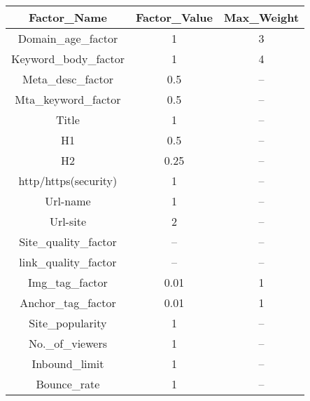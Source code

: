 \documentclass{scrreprt}
\begin{document}
    \begin{center}
\begin{tabular}{ |c|c|c| } 
 \hline 
 
Factor_Name & Factor_Value & Max_Weight \\
 \hline
 Domain_age_factor & 1 & 3 \\
 \hline
 Keyword_body_factor & 1 & 4 \\ 
  \hline
 Meta_desc_factor & 0.5 & -- \\
 \hline
 Mta_keyword_factor & 0.5 & -- \\ 
 \hline
  
 Title & 1 & -- \\
 \hline
 H1 & 0.5 & -- \\ 
  \hline
 H2 & 0.25 & -- \\
 \hline
 http/https(security) & 1 & -- \\ 
  \hline
 Url-name & 1 & --\\
 \hline
 Url-site & 2 & -- \\ 
  \hline
 Site_quality_factor & -- & -- \\
 \hline
 link_quality_factor & -- & -- \\ 
  \hline
 Img_tag_factor & 0.01 & 1 \\
 \hline
 Anchor_tag_factor& 0.01 & 1 \\ 
  \hline
Site_popularity &1 & -- \\
 \hline
 No._of_viewers &1 & -- \\ 
  \hline
 Inbound_limit & 1 & -- \\
 \hline
  Bounce_rate & 1 & -- \\
 \hline
 
 
\end{tabular}
\end{center}
\end{document}
